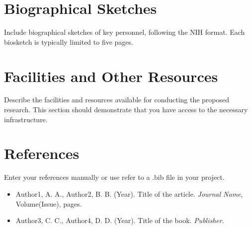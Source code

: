 \documentclass[12pt]{article}
\begin{document}
\newpage

\section{Biographical Sketches}
Include biographical sketches of key personnel, following the NIH format. Each biosketch is typically limited to five pages.

\newpage

\section{Facilities and Other Resources}
Describe the facilities and resources available for conducting the proposed research. This section should demonstrate that you have access to the necessary infrastructure.

\newpage

\section{References}
Enter your references manually or use refer to a .bib file in your project.

\begin{itemize}
    \item Author1, A. A., Author2, B. B. (Year). Title of the article. \textit{Journal Name}, Volume(Issue), pages.
    \item Author3, C. C., Author4, D. D. (Year). Title of the book. \textit{Publisher}.
\end{itemize}

%
% 
\end{document}
